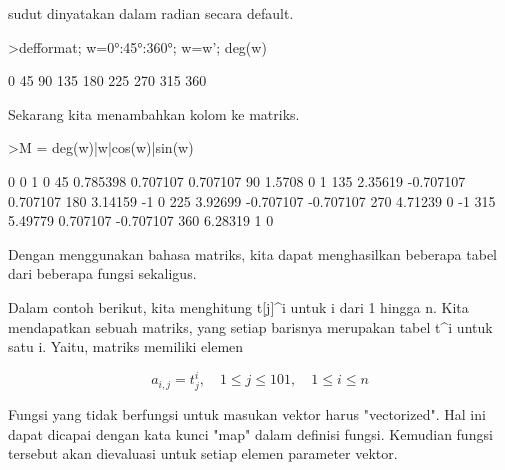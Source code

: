 \documentclass{article}
\begin{document}
\begin{eulernotebook}
\begin{eulercomment}
\begin{eulercomment}
\begin{eulercomment}
\begin{eulercomment}
\begin{eulercomment}
\begin{eulercomment}
\begin{eulercomment}
sudut dinyatakan dalam radian secara default.
\end{eulercomment}
\begin{eulerprompt}
>defformat; w=0°:45°:360°; w=w'; deg(w)
\end{eulerprompt}
\begin{euleroutput}
              0 
             45 
             90 
            135 
            180 
            225 
            270 
            315 
            360 
\end{euleroutput}
\begin{eulercomment}
Sekarang kita menambahkan kolom ke matriks.
\end{eulercomment}
\begin{eulerprompt}
>M = deg(w)|w|cos(w)|sin(w)
\end{eulerprompt}
\begin{euleroutput}
              0             0             1             0 
             45      0.785398      0.707107      0.707107 
             90        1.5708             0             1 
            135       2.35619     -0.707107      0.707107 
            180       3.14159            -1             0 
            225       3.92699     -0.707107     -0.707107 
            270       4.71239             0            -1 
            315       5.49779      0.707107     -0.707107 
            360       6.28319             1             0 
\end{euleroutput}
\begin{eulercomment}
Dengan menggunakan bahasa matriks, kita dapat menghasilkan beberapa
tabel dari beberapa fungsi sekaligus.

Dalam contoh berikut, kita menghitung t[j]\textasciicircum{}i untuk i dari 1 hingga n.
Kita mendapatkan sebuah matriks, yang setiap barisnya merupakan tabel
t\textasciicircum{}i untuk satu i. Yaitu, matriks memiliki elemen \\
\end{eulercomment}
\begin{eulerformula}
\[
a_{i,j} = t_j^i, \quad 1 \le j \le 101, \quad 1 \le i \le n
\]
\end{eulerformula}
\begin{eulercomment}
Fungsi yang tidak berfungsi untuk masukan vektor harus "vectorized".
Hal ini dapat dicapai dengan kata kunci "map" dalam definisi fungsi.
Kemudian fungsi tersebut akan dievaluasi untuk setiap elemen parameter
vektor.


\end{eulercomment}
\end{eulercomment}
\end{eulercomment}
\end{eulercomment}
\end{eulercomment}
\end{eulercomment}
\end{eulercomment}
\end{eulernotebook}
\end{document}
